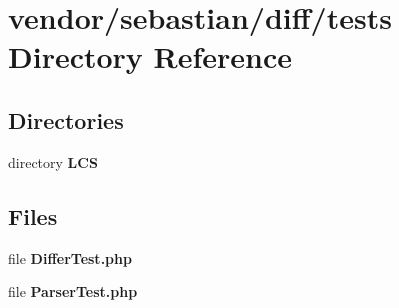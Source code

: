 \section{vendor/sebastian/diff/tests Directory Reference}
\label{dir_9890aff6a889fde26d0725a9399bbfa5}
\subsection*{Directories}
\begin{DoxyCompactItemize}
\item 
directory {\bf L\+C\+S}
\end{DoxyCompactItemize}
\subsection*{Files}
\begin{DoxyCompactItemize}
\item 
file {\bf Differ\+Test.\+php}
\item 
file {\bf Parser\+Test.\+php}
\end{DoxyCompactItemize}

